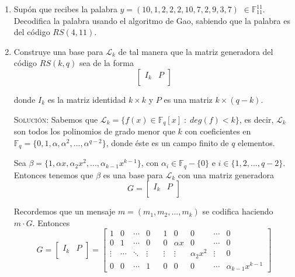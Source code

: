 \documentclass[letterpaper,11pt]{article}
\begin{document}
\begin{enumerate}
    \newpage
    \item Supón que recibes la palabra $y = (10, 1, 2, 2, 2, 10, 7, 2, 9, 3, 7)$
    $\in \mathbb{F}^{11}_{11}$. Decodifica la palabra usando el algoritmo de
    Gao, sabiendo que la palabra es del código $RS(4,11)$.

    \item Construye una base para $\mathcal{L}_{k}$ de tal manera que la matriz
    generadora del código $RS(k, q)$ sea de la forma 
    \begin{equation}
    \begin{bmatrix}
    I_{k} & P\\
    \end{bmatrix}
    \end{equation}
    
    donde $I_{k}$ es la matriz identidad $k \times k$ y $P$ es una matriz 
    $k \times (q-k)$. 
    
    \textsc{Solución:} Sabemos que $\mathcal{L}_{k} = \{f(x) \in 
    \mathbb{F}_{q}[x] \; : \; deg(f) < k\}$, es decir, $\mathcal{L}_{k}$ son 
    todos los polinomios de grado menor que $k$ con coeficientes en 
    $\mathbb{F}_{q} = \{0, 1, \alpha, \alpha^{2}, ..., \alpha^{q-2}\}$, donde 
    éste es un campo finito de $q$ elementos. 

    Sea $\beta = \{1, \alpha x, \alpha_{2} x^{2}, ..., \alpha_{k-1} x^{k-1}\}$,
    con $\alpha_{i} \in \mathbb{F}_{q} - \{0\}$ e $i \in \{1, 2, ..., q - 2\}$.
    Entonces tenemos que $\beta$ es una base para $\mathcal{L}_{k}$ con una 
    matriz generadora 
    \begin{equation*}
        G = 
        \begin{bmatrix}
        I_{k} & P\\
        \end{bmatrix}
    \end{equation*}

    Recordemos que un mensaje $m = (m_1, m_2, ..., m_k)$ se codifica haciendo 
    $m \cdot G$. Entonces 
    \begin{equation*}
        G = 
        \begin{bmatrix}
        I_{k} & P\\
        \end{bmatrix}
        =  
        \begin{bmatrix}
            1 & 0 & \cdots & 0 & & 1 & 0 & 0 & \cdots & 0 \\ 
            0 & 1 & \cdots & 0 & & 0 & \alpha x & 0 & \cdots & 0 \\
            \vdots & \cdots & \ddots & \vdots & & \vdots & \vdots & 
            \alpha_{2} x^{2} & \vdots & 0 \\ 
            0 & 0 & \cdots & 1 & & 0 & 0 & 0 & \cdots & \alpha_{k-1} x^{k-1}  
        \end{bmatrix}
    \end{equation*}


\end{enumerate}
\end{document}
